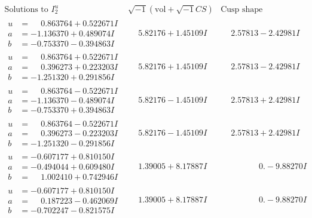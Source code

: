 \documentclass[1p]{elsarticle_modified}
\theoremstyle{definition}
\newcommand{\I}{\sqrt{-1}}
\begin{document}
$$\begin{array}{c|c|c}  
\text{Solutions to }I^u_{2}& \I (\text{vol} + \sqrt{-1}CS) & \text{Cusp shape}\\
 \hline 
\begin{aligned}
u &= \phantom{-}0.863764 + 0.522671 I \\
a &= -1.136370 + 0.489074 I \\
b &= -0.753370 - 0.394863 I\end{aligned}
 & \phantom{-}5.82176 + 1.45109 I & \phantom{-}2.57813 - 2.42981 I \\ \hline\begin{aligned}
u &= \phantom{-}0.863764 + 0.522671 I \\
a &= \phantom{-}0.396273 + 0.223203 I \\
b &= -1.251320 + 0.291856 I\end{aligned}
 & \phantom{-}5.82176 + 1.45109 I & \phantom{-}2.57813 - 2.42981 I \\ \hline\begin{aligned}
u &= \phantom{-}0.863764 - 0.522671 I \\
a &= -1.136370 - 0.489074 I \\
b &= -0.753370 + 0.394863 I\end{aligned}
 & \phantom{-}5.82176 - 1.45109 I & \phantom{-}2.57813 + 2.42981 I \\ \hline\begin{aligned}
u &= \phantom{-}0.863764 - 0.522671 I \\
a &= \phantom{-}0.396273 - 0.223203 I \\
b &= -1.251320 - 0.291856 I\end{aligned}
 & \phantom{-}5.82176 - 1.45109 I & \phantom{-}2.57813 + 2.42981 I \\ \hline\begin{aligned}
u &= -0.607177 + 0.810150 I \\
a &= -0.494044 + 0.609480 I \\
b &= \phantom{-}1.002410 + 0.742946 I\end{aligned}
 & \phantom{-}1.39005 + 8.17887 I & \phantom{-0.000000 } 0. - 9.88270 I \\ \hline\begin{aligned}
u &= -0.607177 + 0.810150 I \\
a &= \phantom{-}0.187223 - 0.462069 I \\
b &= -0.702247 - 0.821575 I\end{aligned}
 & \phantom{-}1.39005 + 8.17887 I & \phantom{-0.000000 } 0. - 9.88270 I \\ \hline\begin{aligned}

\end{aligned}
\end{array}$$
\end{document}
